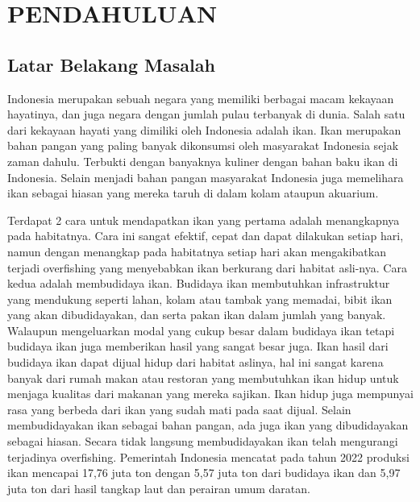 
\chapter{PENDAHULUAN}

\section{Latar Belakang Masalah}

Indonesia merupakan sebuah negara yang memiliki berbagai macam 
kekayaan hayatinya, dan juga negara dengan jumlah pulau terbanyak di dunia. 
Salah satu dari kekayaan hayati yang dimiliki oleh Indonesia adalah ikan. Ikan 
merupakan bahan pangan yang paling banyak dikonsumsi oleh masyarakat 
Indonesia sejak zaman dahulu. Terbukti dengan banyaknya kuliner dengan bahan 
baku ikan di Indonesia. Selain menjadi bahan pangan masyarakat Indonesia juga 
memelihara ikan sebagai hiasan yang mereka taruh di dalam kolam ataupun 
akuarium.

Terdapat 2 cara untuk mendapatkan ikan yang pertama adalah menangkapnya pada habitatnya. 
Cara ini sangat efektif, cepat dan dapat dilakukan setiap hari, namun dengan menangkap 
pada habitatnya setiap hari akan mengakibatkan terjadi overfishing yang menyebabkan ikan 
berkurang dari habitat asli-nya. Cara kedua adalah membudidaya ikan. Budidaya ikan membutuhkan 
infrastruktur yang mendukung seperti lahan, kolam atau tambak yang memadai, bibit ikan yang akan 
dibudidayakan, dan serta pakan ikan dalam jumlah yang banyak. Walaupun mengeluarkan modal yang cukup besar 
dalam budidaya ikan tetapi budidaya ikan juga memberikan hasil yang sangat besar juga. Ikan hasil dari budidaya ikan dapat 
dijual hidup dari habitat aslinya, hal ini sangat karena banyak dari rumah makan atau restoran yang membutuhkan ikan hidup 
untuk menjaga kualitas dari makanan yang mereka sajikan. Ikan hidup juga mempunyai rasa yang berbeda dari ikan yang sudah 
mati pada saat dijual. Selain membudidayakan ikan sebagai bahan pangan, ada juga ikan yang dibudidayakan sebagai hiasan. 
Secara tidak langsung membudidayakan ikan telah mengurangi terjadinya overfishing. 
Pemerintah Indonesia mencatat pada tahun 2022 produksi ikan mencapai 17,76 juta ton dengan 5,57 juta ton dari budidaya ikan 
dan 5,97 juta ton dari hasil tangkap laut dan perairan umum daratan.

